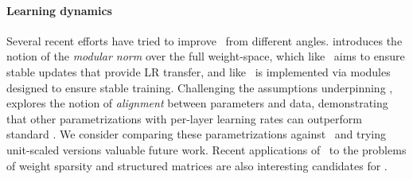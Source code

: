 \paragraph{Learning dynamics}

Several recent efforts have tried to improve \mup\ from different angles.
\citep{Modula} introduces the notion of the \textit{modular norm} over the full weight-space, which like \mup\ aims to ensure stable updates that provide LR transfer, and like \umup\ is implemented via modules designed to ensure stable training.
Challenging the assumptions underpinning \mup, \citep{Scaling_Exponents} explores the notion of \textit{alignment} between parameters and data, demonstrating that other parametrizations with per-layer learning rates can outperform standard \mup. We consider comparing these parametrizations against \umup\ and trying unit-scaled versions valuable future work. Recent applications of \mup\ to the problems of weight sparsity \citep{Sparse_Mup} and structured matrices \citep{Compute_Better_Spent} are also interesting candidates for \umup.
